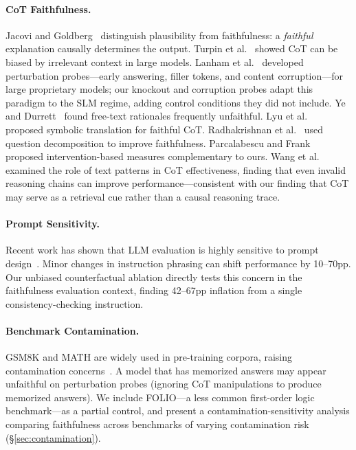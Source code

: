 \documentclass[11pt]{article}
\begin{document}
\paragraph{CoT Faithfulness.} Jacovi and Goldberg~\cite{jacovi2020towards} distinguish plausibility from faithfulness: a \emph{faithful} explanation causally determines the output. Turpin et al.~\cite{turpin2024language} showed CoT can be biased by irrelevant context in large models. Lanham et al.~\cite{lanham2023measuring} developed perturbation probes---early answering, filler tokens, and content corruption---for large proprietary models; our knockout and corruption probes adapt this paradigm to the SLM regime, adding control conditions they did not include. Ye and Durrett~\cite{ye2022unreliability} found free-text rationales frequently unfaithful. Lyu et al.~\cite{lyu2023faithful} proposed symbolic translation for faithful CoT. Radhakrishnan et al.~\cite{radhakrishnan2023question} used question decomposition to improve faithfulness. Parcalabescu and Frank~\cite{parcalabescu2024measuring} proposed intervention-based measures complementary to ours. Wang et al.~\cite{wang2023understanding} examined the role of text patterns in CoT effectiveness, finding that even invalid reasoning chains can improve performance---consistent with our finding that CoT may serve as a retrieval cue rather than a causal reasoning trace.

\paragraph{Prompt Sensitivity.} Recent work has shown that LLM evaluation is highly sensitive to prompt design~\cite{sclar2024quantifying}. Minor changes in instruction phrasing can shift performance by 10--70pp. Our unbiased counterfactual ablation directly tests this concern in the faithfulness evaluation context, finding 42--67pp inflation from a single consistency-checking instruction.

\paragraph{Benchmark Contamination.} GSM8K and MATH are widely used in pre-training corpora, raising contamination concerns~\cite{golchin2024time}. A model that has memorized answers may appear unfaithful on perturbation probes (ignoring CoT manipulations to produce memorized answers). We include FOLIO---a less common first-order logic benchmark---as a partial control, and present a contamination-sensitivity analysis comparing faithfulness across benchmarks of varying contamination risk (\S\ref{sec:contamination}).
\end{document}
